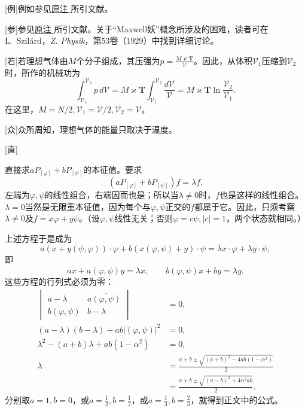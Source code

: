 \documentclass[fontsize=13pt,twoside,openany,headings=normal,parskip=false,bookmarkpackage=false,DIV=calc]{scrbook}
\begin{document}
[例]{例如参见\CJKglue \hyperlink{note-184}{原注 } 所引文献。}

[参]{参见\CJKglue \hyperlink{note-185}{原注 } 所引文献。关于“Maxwell妖”概念所涉及的困难，读者可在L.~Szilárd，\emph{Z. Physik}，第53卷（1929）中找到详细讨论。}

[若]{若理想气体由$M$个分子组成，其压强为$p=\frac{M\varkappa\mathbf T}{\mathcal V}$。因此，从体积$\mathcal V_1$压缩到$\mathcal V_2$时，所作的机械功为
\[
\int_{\mathcal V_1}^{\mathcal V_2}p\,d\mathcal V
=M\varkappa\mathbf T\int_{\mathcal V_1}^{\mathcal V_2}\frac{d\mathcal V}{\mathcal V}
=M\varkappa\mathbf T\ln\frac{\mathcal V_2}{\mathcal V_1}.
\]
在这里，$M=N/2,\allowbreak \mathcal V_1=\mathcal V/2,\allowbreak \mathcal V_2=\mathcal V$。}

[众]{众所周知，理想气体的能量只取决于温度。}

[直]{直接求$aP_{[\varphi]}+bP_{[\psi]}$的本征值。要求
\[
(aP_{[\varphi]}+bP_{[\psi]})f=\lambda f.
\]
左端为$\varphi,\allowbreak \psi$的线性组合，右端因而也是；所以当$\lambda\ne0$时，$f$也是这样的线性组合。$\lambda=0$当然是无限重本征值，因为每个与$\varphi,\allowbreak \psi$正交的$f$都属于它。因此，只须考察$\lambda\ne0$及$f=x\varphi+y\psi$。（设$\varphi,\allowbreak \psi$线性无关；否则$\varphi=c\psi,\allowbreak |c|=1$，两个状态就相同。）

上述方程于是成为
\[
a(x+y(\psi,\varphi))\cdot\varphi+b(x(\varphi,\psi)+y)\cdot\psi
=\lambda x\cdot\varphi+\lambda y\cdot\psi,
\]
即
\[
ax+a\overline{(\varphi,\psi)}y=\lambda x,\qquad
b(\varphi,\psi)x+by=\lambda y.
\]
这些方程的行列式必须为零：
\begin{align*}
\begin{vmatrix}a-\lambda&a\overline{(\varphi,\psi)}\\b(\varphi,\psi)&b-\lambda\end{vmatrix}&=0,\\
(a-\lambda)(b-\lambda)-ab|(\varphi,\psi)|^2&=0,\\
\lambda^2-(a+b)\lambda+ab(1-\alpha^2)&=0,\\
\lambda&=\frac{a+b\pm\sqrt{(a+b)^2-4ab(1-\alpha^2)}}2\\
&=\frac{a+b\pm\sqrt{(a-b)^2+4\alpha^2ab}}2.
\end{align*}
分别取$a=1,\allowbreak b=0$，或$a=\frac12,\allowbreak b=\frac12$，或$a=\frac13,\allowbreak b=\frac23$，就得到正文中的公式。}
\end{document}
